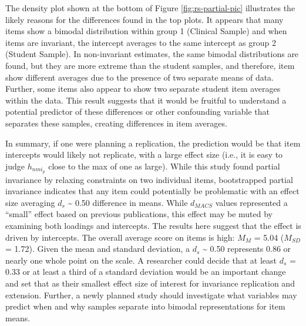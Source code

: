 \documentclass[
  man]{apa7}
\begin{document}
The density plot shown at the bottom of Figure \ref{fig:rs-partial-pic} illustrates the likely reasons for the differences found in the top plots. It appears that many items show a bimodal distribution within group 1 (Clinical Sample) and when items are invariant, the intercept averages to the same intercept as group 2 (Student Sample). In non-invariant estimates, the same bimodal distributions are found, but they are more extreme than the student samples, and therefore, item show different averages due to the presence of two separate means of data. Further, some items also appear to show two separate student item averages within the data. This result suggests that it would be fruitful to understand a potential predictor of these differences or other confounding variable that separates these samples, creating differences in item averages.

In summary, if one were planning a replication, the prediction would be that item intercepts would likely not replicate, with a large effect size (i.e., it is easy to judge \(h_{nmi_p}\) close to the max of one as large). While this study found partial invariance by relaxing constraints on two individual items, bootstrapped partial invariance indicates that any item could potentially be problematic with an effect size averaging \(d_s\) \textasciitilde{} 0.50 difference in means. While \(d_{MACS}\) values represented a ``small'' effect based on previous publications, this effect may be muted by examining both loadings and intercepts. The results here suggest that the effect is driven by intercepts. The overall average score on items is high: \(M_M\) = 5.04 (\(M_{SD}\) = 1.72). Given the mean and standard deviation, a \(d_s\) \textasciitilde{} 0.50 represents 0.86 or nearly one whole point on the scale. A researcher could decide that at least \(d_s\) = 0.33 or at least a third of a standard deviation would be an important change and set that as their smallest effect size of interest for invariance replication and extension. Further, a newly planned study should investigate what variables may predict when and why samples separate into bimodal representations for item means.
\end{document}
